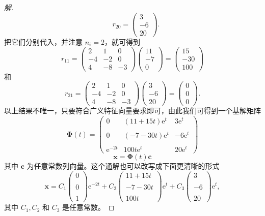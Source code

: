 \begin{enumerate}
\begin{proof}[解]
\[\quad r_{20}=\begin{pmatrix}3 \\-6 \\20\end{pmatrix}.\]
把它们分别代入，并注意 $n_{i}=2$，就可得到
\[r_{11}=\begin{pmatrix}2 & 1 & 0 \\-4 & -2 & 0 \\4 & -8 & -3\end{pmatrix}
\begin{pmatrix}11 \\-7 \\0\end{pmatrix}
=\begin{pmatrix}15 \\-30 \\100\end{pmatrix}\]
和
\[r_{21}=\begin{pmatrix}2 & 1 & 0 \\-4 & -2 & 0 \\4 & -8 & -3\end{pmatrix}
\begin{pmatrix}3 \\-6 \\20\end{pmatrix}
=\begin{pmatrix}0 \\0 \\0\end{pmatrix}.\]
以上结果不唯一，只要符合广义特征向量要求即可，由此我们可得到一个基解矩阵
\[\boldsymbol{\Phi}(t)=\begin{pmatrix}
0 & (11+15t) \mathrm{e}^{t} & 3 \mathrm{e}^{t} \\ \\
0 & (-7-30t) \mathrm{e}^{t} & -6 \mathrm{e}^{t} \\ \\
\mathrm{e}^{-2t} & 100t \mathrm{e}^{t} & 20 \mathrm{e}^{t}
\end{pmatrix}\]
\[\boldsymbol{x}=\boldsymbol{\Phi}(t) \boldsymbol{c}\]
其中 $\boldsymbol{c}$ 为任意常数列向量。这个通解也可以改写成下面更清晰的形式
\[\boldsymbol{x}=C_{1}\begin{pmatrix}0 \\ \\ 0 \\ \\ 1\end{pmatrix} \mathrm{e}^{-2t}
+C_{2}\begin{pmatrix}11+15t \\ \\ -7-30t \\ \\ 100t\end{pmatrix} \mathrm{e}^{t}
+C_{3}\begin{pmatrix}3 \\ \\ -6 \\ \\ 20\end{pmatrix} \mathrm{e}^{t},\]
其中 $C_{1}, C_{2}$ 和 $C_{3}$ 是任意常数。
\end{proof}
\end{enumerate}
